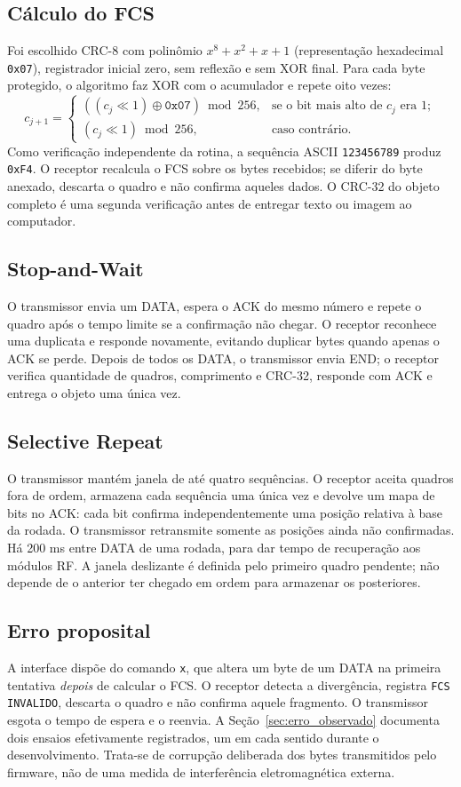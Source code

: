 \documentclass[12pt,a4paper]{article}
\begin{document}
\subsection{Cálculo do FCS}
Foi escolhido CRC-8 com polinômio $x^8+x^2+x+1$ (representação hexadecimal \texttt{0x07}), registrador inicial zero, sem reflexão e sem XOR final. Para cada byte protegido, o algoritmo faz XOR com o acumulador e repete oito vezes:
\begin{equation}
c_{j+1}=\begin{cases}
((c_j\ll 1)\oplus\texttt{0x07})\bmod 256,&\text{se o bit mais alto de }c_j\text{ era 1};\\
(c_j\ll 1)\bmod 256,&\text{caso contrário.}
\end{cases}
\end{equation}
Como verificação independente da rotina, a sequência ASCII \texttt{123456789} produz \texttt{0xF4}. O receptor recalcula o FCS sobre os bytes recebidos; se diferir do byte anexado, descarta o quadro e não confirma aqueles dados. O CRC-32 do objeto completo é uma segunda verificação antes de entregar texto ou imagem ao computador.

\subsection{Stop-and-Wait}
O transmissor envia um DATA, espera o ACK do mesmo número e repete o quadro após o tempo limite se a confirmação não chegar. O receptor reconhece uma duplicata e responde novamente, evitando duplicar bytes quando apenas o ACK se perde. Depois de todos os DATA, o transmissor envia END; o receptor verifica quantidade de quadros, comprimento e CRC-32, responde com ACK e entrega o objeto uma única vez.

\subsection{Selective Repeat}
O transmissor mantém janela de até quatro sequências. O receptor aceita quadros fora de ordem, armazena cada sequência uma única vez e devolve um mapa de bits no ACK: cada bit confirma independentemente uma posição relativa à base da rodada. O transmissor retransmite somente as posições ainda não confirmadas. Há 200 ms entre DATA de uma rodada, para dar tempo de recuperação aos módulos RF. A janela deslizante é definida pelo primeiro quadro pendente; não depende de o anterior ter chegado em ordem para armazenar os posteriores.

\subsection{Erro proposital}
A interface dispõe do comando \texttt{x}, que altera um byte de um DATA na primeira tentativa \emph{depois} de calcular o FCS. O receptor detecta a divergência, registra \texttt{FCS INVALIDO}, descarta o quadro e não confirma aquele fragmento. O transmissor esgota o tempo de espera e o reenvia. A Seção~\ref{sec:erro_observado} documenta dois ensaios efetivamente registrados, um em cada sentido durante o desenvolvimento. Trata-se de corrupção deliberada dos bytes transmitidos pelo firmware, não de uma medida de interferência eletromagnética externa.
\end{document}
